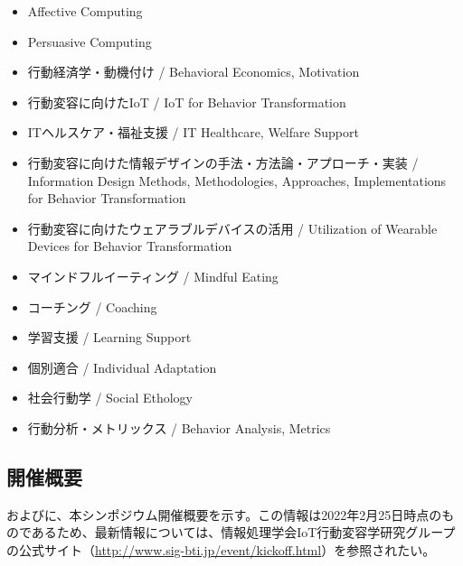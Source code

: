 \documentclass[a4paper,twocolumn,9pt]{jsarticle}
\begin{document}
\begin{itemize}
\item Affective Computing
\item Persuasive Computing
\item 行動経済学・動機付け / Behavioral Economics, Motivation
\item 行動変容に向けたIoT / IoT for Behavior Transformation
\item ITヘルスケア・福祉支援 / IT Healthcare, Welfare Support
\item 行動変容に向けた情報デザインの手法・方法論・アプローチ・実装 / Information Design Methods, Methodologies, Approaches, Implementations for Behavior Transformation
\item 行動変容に向けたウェアラブルデバイスの活用 / Utilization of Wearable Devices for Behavior Transformation
\item マインドフルイーティング / Mindful Eating
\item コーチング / Coaching
\item 学習支援 / Learning Support
\item 個別適合 / Individual Adaptation
\item 社会行動学 / Social Ethology
\item 行動分析・メトリックス / Behavior Analysis, Metrics
\end{itemize}


\subsection{開催概要}

およびに、本シンポジウム開催概要を示す。この情報は2022年2月25日時点のものであるため、最新情報については、情報処理学会IoT行動変容学研究グループの公式サイト（\url{http://www.sig-bti.jp/event/kickoff.html}）を参照されたい。
\end{document}
